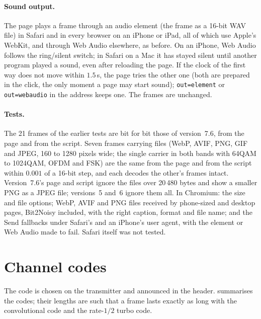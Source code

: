 \documentclass[11pt,a4paper]{article}
\newcommand{\code}[1]{\texttt{#1}}
\theoremstyle{remark}
\begin{document}
\paragraph{Sound output.}
The page plays a frame through an audio element (the frame as a 16-bit WAV file) in Safari and in every browser on an iPhone or iPad, all of which use Apple's WebKit, and through Web Audio elsewhere, as before. On an iPhone, Web Audio follows the ring/silent switch; in Safari on a Mac it has stayed silent until another program played a sound, even after reloading the page. If the clock of the first way does not move within $1.5$\,s, the page tries the other one (both are prepared in the click, the only moment a page may start sound); \code{out=element} or \code{out=webaudio} in the address keeps one. The frames are unchanged.

\paragraph{Tests.}
The 21 frames of the earlier tests are bit for bit those of version~7.6, from the page and from the script.
Seven frames carrying files (WebP, AVIF, PNG, GIF and JPEG, 160 to 1280 pixels wide; the single carrier in both bands with 64QAM to 1024QAM, OFDM and FSK) are the same from the page and from the script within $0.001$ of a 16-bit step, and each decodes the other's frames intact.
Version~7.6's page and script ignore the files over 20\,480 bytes and show a smaller PNG as a JPEG file; versions~5 and~6 ignore them all.
In Chromium: the size and file options; WebP, AVIF and PNG files received by phone-sized and desktop pages, Bit2Noisy included, with the right caption, format and file name; and the Send fallbacks under Safari's and an iPhone's user agent, with the element or Web Audio made to fail. Safari itself was not tested.

\section{Channel codes}
\label{sec:codes}
The code is chosen on the transmitter and announced in the header.  summarises the codes; their lengths are such that a frame lasts exactly as long with the convolutional code and the rate-$1/2$ turbo code.
\end{document}

